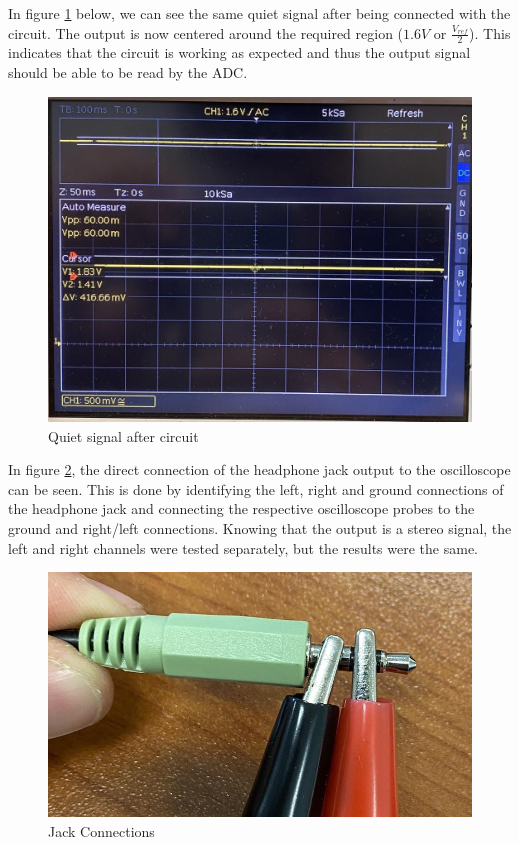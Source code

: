 \documentclass{cce2014-design}
\begin{document}
In figure \ref*{fig:quietaftercircuit} below, we can see the same quiet signal after being connected with the circuit.
The output is now centered around the required region ($1.6V$ or $\frac{V_{ref}}{2}$).
This indicates that the circuit is working as expected and thus the output signal should be able to be read by the ADC.

\vspace{1em}
\begin{figure}[!h]
   \centering
   \includegraphics[width=0.8\linewidth]{quite_shifted.jpg}
   \caption{Quiet signal after circuit}
   \label{fig:quietaftercircuit}
\end{figure}
\vspace{1em}

In figure \ref*{fig:jacks}, the direct connection of the headphone jack output to the oscilloscope can be seen. This is done by identifying the left, right and ground connections of the headphone jack and connecting the respective oscilloscope probes to the ground and right/left connections. Knowing that the output is a stereo signal, the left and right channels were tested separately, but the results were the same.

\begin{figure}[!h]
   \centering
   \includegraphics[width=0.8\linewidth]{jack_connections.jpg}
   \caption{Jack Connections}
   \label{fig:jacks}
\end{figure}
\end{document}
